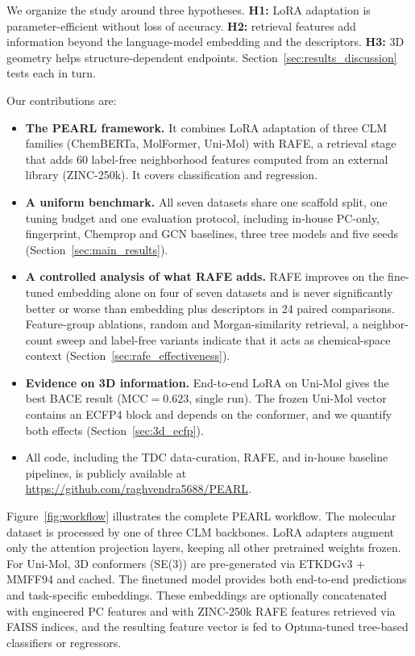 \documentclass[pdflatex,sn-basic]{sn-jnl}%
\begin{document}
We organize the study around three hypotheses. \textbf{H1:} LoRA adaptation is parameter-efficient without loss of accuracy. \textbf{H2:} retrieval features add information beyond the language-model embedding and the descriptors. \textbf{H3:} 3D geometry helps structure-dependent endpoints. Section~\ref{sec:results_discussion} tests each in turn.

Our contributions are:
\begin{itemize}
  \item \textbf{The PEARL framework.} It combines LoRA adaptation of three CLM families (ChemBERTa, MolFormer, Uni-Mol) with RAFE, a retrieval stage that adds 60 label-free neighborhood features computed from an external library (ZINC-250k). It covers classification and regression.
  \item \textbf{A uniform benchmark.} All seven datasets share one scaffold split, one tuning budget and one evaluation protocol, including in-house PC-only, fingerprint, Chemprop and GCN baselines, three tree models and five seeds (Section~\ref{sec:main_results}).
  \item \textbf{A controlled analysis of what RAFE adds.} RAFE improves on the fine-tuned embedding alone on four of seven datasets and is never significantly better or worse than embedding plus descriptors in 24 paired comparisons. Feature-group ablations, random and Morgan-similarity retrieval, a neighbor-count sweep and label-free variants indicate that it acts as chemical-space context (Section~\ref{sec:rafe_effectiveness}).
  \item \textbf{Evidence on 3D information.} End-to-end LoRA on Uni-Mol gives the best BACE result (MCC$=0.623$, single run). The frozen Uni-Mol vector contains an ECFP4 block and depends on the conformer, and we quantify both effects (Section~\ref{sec:3d_ecfp}).
  \item All code, including the TDC data-curation, RAFE, and in-house baseline pipelines, is publicly available at \url{https://github.com/raghvendra5688/PEARL}.
\end{itemize}

Figure~\ref{fig:workflow} illustrates the complete PEARL workflow. The molecular dataset is processed by one of three CLM backbones. LoRA adapters augment only the attention projection layers, keeping all other pretrained weights frozen. For Uni-Mol, 3D conformers (SE(3)) are pre-generated via ETKDGv3 + MMFF94 and cached. The finetuned model provides both end-to-end predictions and task-specific embeddings. These embeddings are optionally concatenated with engineered PC features and with ZINC-250k RAFE features retrieved via FAISS indices, and the resulting feature vector is fed to Optuna-tuned tree-based classifiers or regressors.
\end{document}
